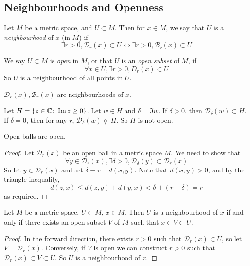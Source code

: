 \subsection{Neighbourhoods and Openness}
\begin{definition}
	Let \( M \) be a metric space, and \( U \subset M \).
	Then for \( x \in M \), we say that \( U \) is a \textit{neighbourhood} of \( x \) (in \( M \)) if
	\[
		\exists r > 0, \mathcal D_r(x) \subset U \iff \exists r > 0, \mathcal B_r(x) \subset U
	\]
\end{definition}
\begin{definition}
	We say \( U \subset M \) is \textit{open} in \( M \), or that \( U \) is an \textit{open subset} of \( M \), if
	\[
		\forall x \in U, \exists r > 0, D_r(x) \subset U
	\]
	So \( U \) is a neighbourhood of all points in \( U \).
\end{definition}
\begin{example}
	\( \mathcal D_r(x), \mathcal B_r(x) \) are neighbourhoods of \( x \).
\end{example}
\begin{example}
	Let \( H = \qty{ z \in \mathbb C \colon \Im z \geq 0 } \).
	Let \( w \in H \) and \( \delta = \Im w \).
	If \( \delta > 0 \), then \( \mathcal D_\delta(w) \subset H \).
	If \( \delta = 0 \), then for any \( r \), \( \mathcal D_\delta(w) \not\subset H \).
	So \( H \) is not open.
\end{example}
\begin{lemma}
	Open balls are open.
\end{lemma}
\begin{proof}
	Let \( \mathcal D_r(x) \) be an open ball in a metric space \( M \).
	We need to show that
	\[
		\forall y \in \mathcal D_r(x), \exists \delta > 0, \mathcal D_\delta(y) \subset \mathcal D_r(x)
	\]
	So let \( y \in \mathcal D_r(x) \) and set \( \delta = r - d(x,y) \).
	Note that \( d(x,y) > 0 \), and by the triangle inequality,
	\[
		d(z,x) \leq d(z,y) + d(y,x) < \delta + (r-\delta) = r
	\]
	as required.
\end{proof}
\begin{corollary}
	Let \( M \) be a metric space, \( U \subset M \), \( x \in M \).
	Then \( U \) is a neighbourhood of \( x \) if and only if there exists an open subset \( V \) of \( M \) such that \( x \in V \subset U \).
\end{corollary}
\begin{proof}
	In the forward direction, there exists \( r > 0 \) such that \( \mathcal D_r(x) \subset U \), so let \( V = \mathcal D_r(x) \).
	Conversely, if \( V \) is open we can construct \( r > 0 \) such that \( \mathcal D_r(x) \subset V \subset U \).
	So \( U \) is a neighbourhood of \( x \).
\end{proof}

